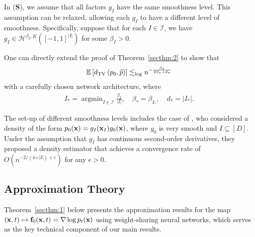 \documentclass[twoside,11pt]{article}
\def\cH{\mathcal H}
\def\cI{\mathcal I}
\newcommand{\bff}{{\bf f}}
\newcommand{\bS}{{\bf S}}
\newcommand{\bx}{{\bf x}}
\newcommand{\bbE}{{\mathbb E}}
\newcommand{\bean}{\setlength\arraycolsep{1pt}\begin{eqnarray*}}
\newcommand{\eean}{\end{eqnarray*}}
\DeclareMathOperator*{\argmin}{argmin}
\begin{document}
\begin{remark}
In (\bS), we assume that all factors $g_{I}$ have the same smoothness level. This assumption can be relaxed, allowing each $g_I$ to have a different level of smoothness.
Specifically, suppose that for each $I \in \cI$, we have $g_{I} \in \cH^{\beta_I,K} ( [-1,1]^{\vert I \vert} ) $ for some $\beta_I > 0$.

One can directly extend the proof of Theorem~\ref{secthm:2} to show that
\bean
\bbE \left[ d_{\rm TV} \left( p_{0}, \widehat p \right) \right]
\lesssim_{\log} n^{-\frac{  \beta_* }{2  \beta_* +  d_* }}
\eean
with a carefully chosen network architecture, where 
\bean
I_* = \argmin_{ I \in \cI } \frac{\beta_I}{ \vert I \vert },
\quad \beta_{*} = \beta_{I_*},
\quad d_* = \vert I_* \vert.
\eean

The set-up of different smoothness levels includes the case of \citet{liu2007sparse}, who considered a density of the form $p_0(\bx) = g_{I} (\bx_{I}) g_{0}(\bx)$, where $g_0$ is very smooth and $I \subseteq [D]$.
Under the assumption that $g_I$ has continuous second-order derivatives, they proposed a density estimator that achieves a convergence rate of $O(n^{-2/(4+\vert I \vert) + \epsilon} )$ for any $\epsilon > 0$.
\end{remark}





\subsection{Approximation Theory}
\label{sec:approx}

Theorem~\ref{secthm:1} below presents the approximation results for the map $(\bx, t) \mapsto \bff_0(\bx, t) = \nabla \log p_t(\bx)$ using weight-sharing neural networks, which serves as the key technical component of our main results.
\end{document}
